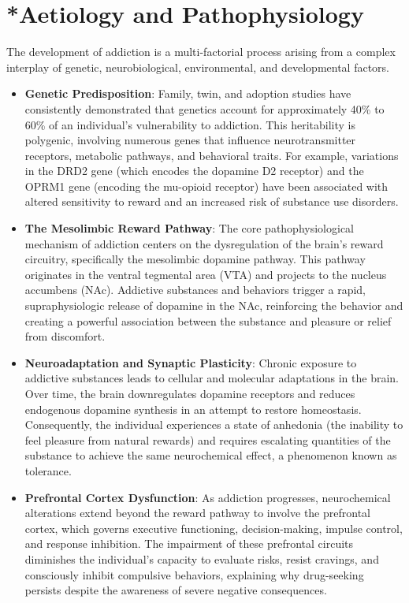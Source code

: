\section{*{Aetiology and Pathophysiology}}
The development of addiction is a multi-factorial process arising from a complex interplay of genetic, neurobiological, environmental, and developmental factors.
\begin{itemize}
    \item \textbf{Genetic Predisposition}: Family, twin, and adoption studies have consistently demonstrated that genetics account for approximately 40\% to 60\% of an individual's vulnerability to addiction. This heritability is polygenic, involving numerous genes that influence neurotransmitter receptors, metabolic pathways, and behavioral traits. For example, variations in the DRD2 gene (which encodes the dopamine D2 receptor) and the OPRM1 gene (encoding the mu-opioid receptor) have been associated with altered sensitivity to reward and an increased risk of substance use disorders.
    \item \textbf{The Mesolimbic Reward Pathway}: The core pathophysiological mechanism of addiction centers on the dysregulation of the brain's reward circuitry, specifically the mesolimbic dopamine pathway. This pathway originates in the ventral tegmental area (VTA) and projects to the nucleus accumbens (NAc). Addictive substances and behaviors trigger a rapid, supraphysiologic release of dopamine in the NAc, reinforcing the behavior and creating a powerful association between the substance and pleasure or relief from discomfort.
    \item \textbf{Neuroadaptation and Synaptic Plasticity}: Chronic exposure to addictive substances leads to cellular and molecular adaptations in the brain. Over time, the brain downregulates dopamine receptors and reduces endogenous dopamine synthesis in an attempt to restore homeostasis. Consequently, the individual experiences a state of anhedonia (the inability to feel pleasure from natural rewards) and requires escalating quantities of the substance to achieve the same neurochemical effect, a phenomenon known as tolerance.
    \item \textbf{Prefrontal Cortex Dysfunction}: As addiction progresses, neurochemical alterations extend beyond the reward pathway to involve the prefrontal cortex, which governs executive functioning, decision-making, impulse control, and response inhibition. The impairment of these prefrontal circuits diminishes the individual's capacity to evaluate risks, resist cravings, and consciously inhibit compulsive behaviors, explaining why drug-seeking persists despite the awareness of severe negative consequences.

\end{itemize}
